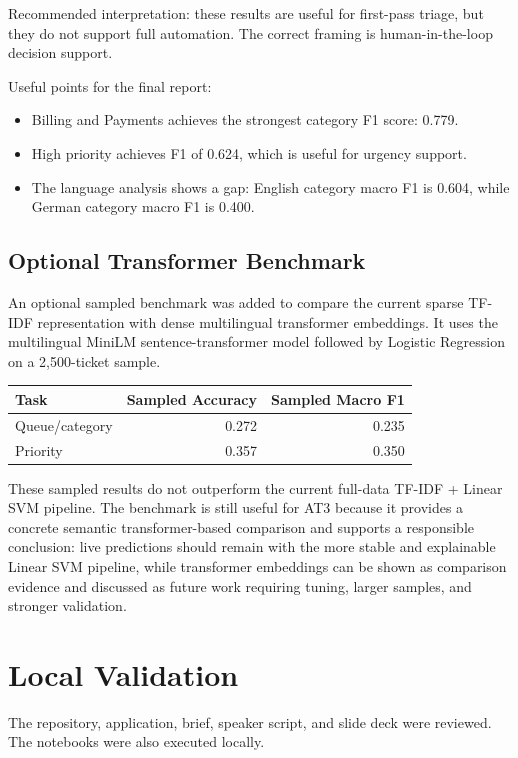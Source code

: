 \documentclass[11pt,a4paper]{article}
\begin{document}
Recommended interpretation: these results are useful for first-pass triage, but they do not support full automation. The correct framing is human-in-the-loop decision support.

Useful points for the final report:
\begin{itemize}
  \item Billing and Payments achieves the strongest category F1 score: 0.779.
  \item High priority achieves F1 of 0.624, which is useful for urgency support.
  \item The language analysis shows a gap: English category macro F1 is 0.604, while German category macro F1 is 0.400.
\end{itemize}

\subsection*{Optional Transformer Benchmark}
An optional sampled benchmark was added to compare the current sparse TF-IDF representation with dense multilingual transformer embeddings. It uses the multilingual MiniLM sentence-transformer model followed by Logistic Regression on a 2,500-ticket sample.

\begin{center}
\begin{tabular}{lrr}
\toprule
\textbf{Task} & \textbf{Sampled Accuracy} & \textbf{Sampled Macro F1} \\
\midrule
Queue/category & 0.272 & 0.235 \\
Priority & 0.357 & 0.350 \\
\bottomrule
\end{tabular}
\end{center}

These sampled results do not outperform the current full-data TF-IDF + Linear SVM pipeline. The benchmark is still useful for AT3 because it provides a concrete semantic transformer-based comparison and supports a responsible conclusion: live predictions should remain with the more stable and explainable Linear SVM pipeline, while transformer embeddings can be shown as comparison evidence and discussed as future work requiring tuning, larger samples, and stronger validation.

\section{Local Validation}
The repository, application, brief, speaker script, and slide deck were reviewed. The notebooks were also executed locally.
\end{document}
